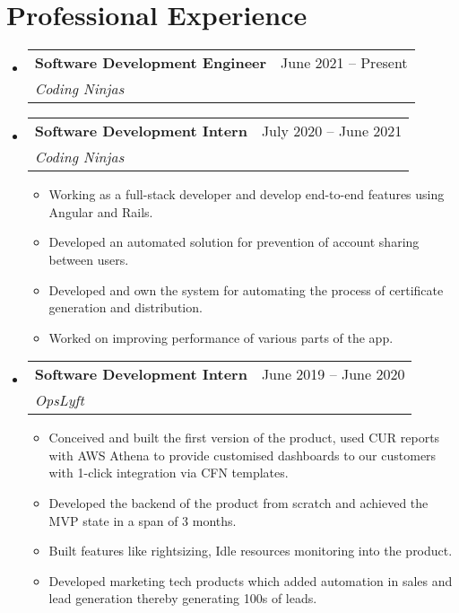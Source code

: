 \documentclass[letterpaper,11pt]{article}
\makeatletter
\newcommand{\resumeItem}[1]{
  \item\small{
    {#1 \vspace{-2pt}}
  }
}
\newcommand{\resumeSubheading}[4]{
  \vspace{-2pt}\item
    \begin{tabular*}{0.97\textwidth}[t]{l@{\extracolsep{\fill}}r}
      \textbf{#1} & #2 \\
      \textit{\small#3} & \textit{\small #4} \\
    \end{tabular*}\vspace{-7pt}
}
\newcommand{\resumeSubSubheading}[2]{
    \item
    \begin{tabular*}{0.97\textwidth}{l@{\extracolsep{\fill}}r}
      \textit{\small#1} & \textit{\small #2} \\
    \end{tabular*}\vspace{-7pt}
}
\newcommand{\resumeSubHeadingListStart}{\begin{itemize}[leftmargin=0.15in, label={}]}
\newcommand{\resumeSubHeadingListEnd}{\end{itemize}}
\newcommand{\resumeItemListStart}{\begin{itemize}}
\newcommand{\resumeItemListEnd}{\end{itemize}\vspace{-5pt}}
\makeatother
\begin{document}
\section{Professional Experience}
  \resumeSubHeadingListStart

  \resumeSubheading
    {Software Development Engineer}{June 2021 -- Present}
    {Coding Ninjas}{}
  \resumeSubheading
      {Software Development Intern}{July 2020 -- June 2021}
      {Coding Ninjas}{}
      \resumeItemListStart
        \resumeItem{Working as a full-stack developer and develop end-to-end features using Angular and Rails.}
        \resumeItem{Developed an automated solution for prevention of account sharing between users.}
        \resumeItem{Developed and own the system for automating the process of certificate generation and distribution.}
        \resumeItem{Worked on improving performance of various parts of the app.}
      \resumeItemListEnd
      

    \resumeSubheading
      {Software Development Intern}{June 2019 -- June 2020}
      {OpsLyft}{}
      \resumeItemListStart
        \resumeItem{Conceived and built the first version of the product, used CUR reports with AWS Athena to provide customised dashboards to our customers with 1-click integration via CFN templates.}
        \resumeItem{Developed the backend of the product from scratch and achieved the MVP state in a span of 3 months.}
        \resumeItem{Built features like rightsizing, Idle resources monitoring into the product.}
        \resumeItem{Developed marketing tech products which added automation in sales and lead generation thereby generating 100s of leads.}
    \resumeItemListEnd
  \resumeSubHeadingListEnd


\end{document}
